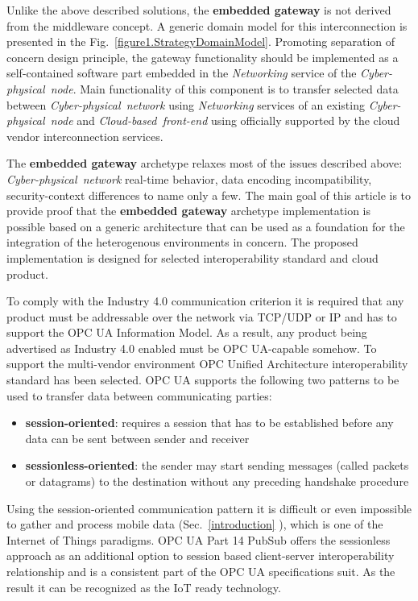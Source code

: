 \documentclass{article}
\providecommand{\tightlist} { \setlength{\itemsep}{0pt}\setlength{\parskip}{0pt}}
\begin{document}
Unlike the above described solutions, the \textbf{embedded gateway} is not derived from the middleware concept. A generic domain model for this interconnection is presented in the Fig.~\ref*{figure1.StrategyDomainModel}. Promoting separation of concern design principle, the gateway functionality should be implemented as a self-contained software part embedded in the \textit{Networking} service of the \textit{Cyber-physical\ node}. Main functionality of this component is to transfer selected data between \textit{Cyber-physical\ network} using \textit{Networking} services of an existing \textit{Cyber-physical\ node} and \textit{Cloud-based\ front-end} using officially supported by the cloud vendor interconnection services.

The \textbf{embedded gateway} archetype relaxes most of the issues described above: \textit{Cyber-physical\ network} real-time behavior, data encoding incompatibility, security-context differences to name only a few. The main goal of this article is to provide proof that the \textbf{embedded gateway} archetype implementation is possible based on a generic architecture that can be used as a foundation for the integration of the heterogenous environments in concern. The proposed implementation is designed for selected interoperability standard and cloud product.

To comply with the Industry 4.0 communication criterion it is required that any product must be addressable over the network via TCP/UDP or IP and has to support the OPC UA Information Model. As a result, any product being advertised as Industry 4.0 enabled must be OPC UA-capable somehow. To support the multi-vendor environment OPC Unified Architecture interoperability standard has been selected. OPC UA supports the following two patterns to be used to transfer data between communicating parties:

\begin{itemize}
      \tightlist
      \item \textbf{session-oriented}: requires a session that has to be established before any data can be sent between sender and receiver
      \item \textbf{sessionless-oriented}: the sender may start sending messages (called packets or datagrams) to the destination without any preceding handshake procedure
\end{itemize}

Using the session-oriented communication pattern it is difficult or even impossible to gather and process mobile data (Sec.~\ref*{introduction} ), which is one of the Internet of Things paradigms. OPC UA Part 14 PubSub \cite{RefWorks:doc:5d98837de4b055984c0eecf0}  offers the sessionless approach as an additional option to session based client-server interoperability relationship and is a consistent part of the OPC UA specifications suit. As the result it can be recognized as the IoT ready technology.
\end{document}
